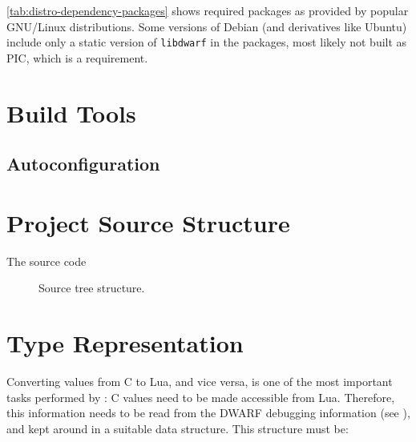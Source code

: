 \autoref{tab:distro-dependency-packages} shows required packages as provided
by popular GNU/Linux distributions. Some versions of Debian (and derivatives
like Ubuntu) include only a static version of \verb|libdwarf| in the packages,
most likely not built as \gls{PIC}, which is a requirement.


\section{Build Tools}

\subsection{Autoconfiguration}
  \label{sec:running-configure}

\section{Project Source Structure}

The \Eol* source code

\begin{figure}[h]
    \centering
    \noindent\begin{minipage}{0.75\textwidth}
    \end{minipage}
    \caption{Source tree structure.}
\end{figure}



\section{Type Representation}

Converting values from C to Lua, and vice versa, is one of the most important
tasks performed by \Eol*: C values need to be made accessible from Lua.
Therefore, this information needs to be read from the DWARF debugging
information (see ), and kept around in
a suitable data structure. This structure must be:

